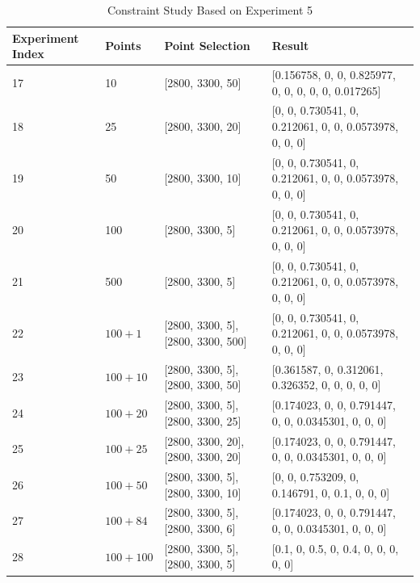 \begin{table} \tiny 
\begin{center}
\begin{tabular}{| l | l | p{3cm}  | p{6cm} |}
\hline
Experiment Index & Points & Point Selection & Result \\ \hline
17 & 10 & [2800, 3300, 50] & [0.156758, 0, 0, 0.825977, 0, 0, 0, 0, 0, 0.017265] \\ \hline
18 & 25 & [2800, 3300, 20] & [0, 0, 0.730541, 0, 0.212061, 0, 0, 0.0573978, 0, 0, 0] \\ \hline
19 & 50 & [2800, 3300, 10] & [0, 0, 0.730541, 0, 0.212061, 0, 0, 0.0573978, 0, 0, 0] \\ \hline
20 & 100 & [2800, 3300, 5] & [0, 0, 0.730541, 0, 0.212061, 0, 0, 0.0573978, 0, 0, 0] \\ \hline
21 & 500 & [2800, 3300, 5] & [0, 0, 0.730541, 0, 0.212061, 0, 0, 0.0573978, 0, 0, 0] \\ \hline	
22 & $100 + 1$ & [2800, 3300, 5], [2800, 3300, 500] & [0, 0, 0.730541, 0, 0.212061, 0, 0, 0.0573978, 0, 0, 0] \\ \hline
23 & $100 + 10$ & [2800, 3300, 5], [2800, 3300, 50] & [0.361587, 0, 0.312061, 0.326352, 0, 0, 0, 0, 0] \\ \hline
24 & $100 + 20$ & [2800, 3300, 5], [2800, 3300, 25] & [0.174023, 0, 0, 0.791447, 0, 0, 0.0345301, 0, 0, 0] \\ \hline
25 & $100 + 25$ & [2800, 3300, 20], [2800, 3300, 20] & [0.174023, 0, 0, 0.791447, 0, 0, 0.0345301, 0, 0, 0] \\ \hline
26 & $100 + 50$ & [2800, 3300, 5], [2800, 3300, 10] & [0, 0, 0.753209, 0, 0.146791, 0, 0.1, 0, 0, 0] \\ \hline
27 & $100 + 84$ & [2800, 3300, 5], [2800, 3300, 6] & [0.174023, 0, 0, 0.791447, 0, 0, 0.0345301, 0, 0, 0] \\ \hline
28 & $100 + 100$ & [2800, 3300, 5], [2800, 3300, 5] & [0.1, 0, 0.5, 0, 0.4, 0, 0, 0, 0, 0] \\ 
\hline
\end{tabular} \\
\caption{Constraint Study Based on Experiment 5}\label{tab:3.6}
\end{center}
\end{table}

